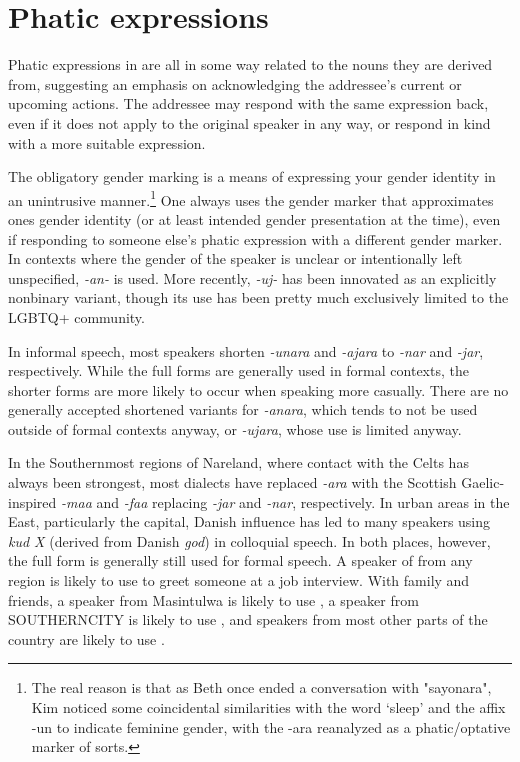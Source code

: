 \section{Phatic expressions}

Phatic expressions in \lang{} are all in some way related to the nouns they are derived from, suggesting an emphasis on acknowledging the addressee's current or upcoming actions. The addressee may respond with the same expression back, even if it does not apply to the original speaker in any way, or respond in kind with a more suitable expression.

The obligatory gender marking is a means of expressing your gender identity in an unintrusive manner.\footnote{The real reason is that as Beth once ended a conversation with "sayonara", Kim noticed some coincidental similarities with the word  `sleep' and the affix -un to indicate feminine gender, with the -ara reanalyzed as a phatic/optative marker of sorts.} One always uses the gender marker that approximates ones gender identity (or at least intended gender presentation at the time), even if responding to someone else's phatic expression with a different gender marker. In contexts where the gender of the speaker is unclear or intentionally left unspecified, \textit{-an-} is used. More recently, \textit{-uj-} has been innovated as an explicitly nonbinary variant, though its use has been pretty much exclusively limited to the LGBTQ+ community.

In informal speech, most speakers shorten \textit{-unara} and \textit{-ajara} to \textit{-nar} and \textit{-jar}, respectively. While the full forms are generally used in formal contexts, the shorter forms are more likely to occur when speaking more casually. There are no generally accepted shortened variants for \textit{-anara}, which tends to not be used outside of formal contexts anyway, or \textit{-ujara}, whose use is limited anyway. 

In the Southernmost regions of Nareland, where contact with the Celts has always been strongest, most dialects have replaced \textit{-ara} with the Scottish Gaelic-inspired \textit{-maa} and \textit{-faa} replacing \textit{-jar} and \textit{-nar}, respectively. 
In urban areas in the East, particularly the capital, Danish influence has led to many speakers using \textit{kud X} (derived from Danish \textit{god}) in colloquial speech. 
In both places, however, the full form is generally still used for formal speech. A speaker of \lang{} from any region is likely to use \textit{} to greet someone at a job interview. 
With family and friends, a speaker from Masintulwa is likely to use \textit{}, a speaker from SOUTHERNCITY is likely to use \textit{}, and speakers from most other parts of the country are likely to use \textit{}.

